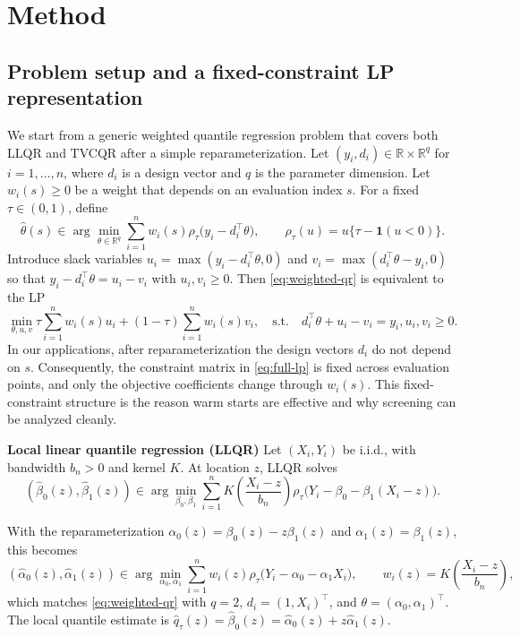 \documentclass[lineno]{biometrika}
\begin{document}
\section{Method}\label{sec:method}

\subsection{Problem setup and a fixed-constraint LP representation}

We start from a generic weighted quantile regression problem that covers both LLQR and TVCQR after a simple
reparameterization. Let $(y_i,d_i)\in\mathbb R\times\mathbb R^q$ for $i=1,\ldots,n$, where $d_i$ is a design vector and
$q$ is the parameter dimension. Let $w_i(s)\ge 0$ be a weight that depends on an evaluation index $s$. For a fixed
$\tau\in(0,1)$, define
\begin{equation}
\hat\theta(s)\in\arg\min_{\theta\in\mathbb R^q}\sum_{i=1}^n w_i(s) \rho_\tau \bigl(y_i-d_i^\top\theta\bigr),
\qquad
\rho_\tau(u)=u\{\tau-\mathbf 1(u<0)\}.
\label{eq:weighted-qr}
\end{equation}
Introduce slack variables $u_i=\max(y_i-d_i^\top\theta,0)$ and $v_i=\max(d_i^\top\theta-y_i,0)$ so that
$y_i-d_i^\top\theta=u_i-v_i$ with $u_i,v_i\ge 0$. Then \eqref{eq:weighted-qr} is equivalent to the LP
\begin{equation}
\min_{\theta,u,v} \tau\sum_{i=1}^n w_i(s)u_i + (1-\tau)\sum_{i=1}^n w_i(s)v_i,
\quad\text{s.t.}\quad
d_i^\top\theta+u_i-v_i=y_i,   u_i,v_i\ge 0.
\label{eq:full-lp}
\end{equation}
In our applications, after reparameterization the design vectors $d_i$ do not depend on $s$. Consequently, the constraint
matrix in \eqref{eq:full-lp} is fixed across evaluation points, and only the objective coefficients change through $w_i(s)$.
This fixed-constraint structure is the reason warm starts are effective and why screening can be analyzed cleanly.


\textbf{Local linear quantile regression (LLQR)}
Let $(X_i,Y_i)$ be i.i.d., with bandwidth $b_n>0$ and kernel $K$. At location $z$, LLQR solves
\begin{equation}\label{eq:LLQR}
    (\hat\beta_0(z),\hat\beta_1(z))\in
\arg\min_{\beta_0,\beta_1}\sum_{i=1}^n
K \left(\frac{X_i-z}{b_n}\right)\rho_\tau \bigl(Y_i-\beta_0-\beta_1(X_i-z)\bigr).
\end{equation}

With the reparameterization $\alpha_0(z)=\beta_0(z)-z\beta_1(z)$ and $\alpha_1(z)=\beta_1(z)$, this becomes
\begin{equation}
(\hat\alpha_0(z),\hat\alpha_1(z))\in
\arg\min_{\alpha_0,\alpha_1}\sum_{i=1}^n w_i(z) \rho_\tau \bigl(Y_i-\alpha_0-\alpha_1 X_i\bigr),
\qquad
w_i(z)=K \left(\frac{X_i-z}{b_n}\right),
\label{eq:llqr-reparam}
\end{equation}
which matches \eqref{eq:weighted-qr} with $q=2$, $d_i=(1,X_i)^\top$, and $\theta=(\alpha_0,\alpha_1)^\top$.
The local quantile estimate is $\hat q_\tau(z)=\hat\beta_0(z)=\hat\alpha_0(z)+z\hat\alpha_1(z)$.
\end{document}

